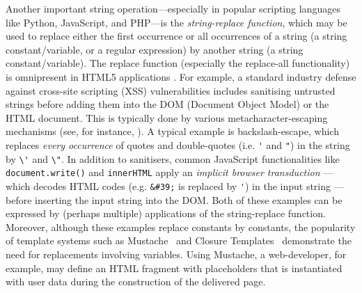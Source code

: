 Another important string operation---especially in popular scripting
languages like Python, JavaScript, and PHP---is the \emph{string-replace function}, 
which may be used to replace either the first occurrence or
all occurrences of a string (a string constant/variable, or a regular expression) by 
another string (a string constant/variable). The replace function (especially 
the replace-all functionality) is omnipresent in HTML5 applications
\cite{LB16,TCJ16,YABI14}. 
For example, a standard industry defense against cross-site scripting 
(XSS) vulnerabilities includes sanitising untrusted strings before adding them
into the DOM (Document Object Model) or the HTML document. 
This is typically done by %
various metacharacter-escaping mechanisms (see, for instance, 
\cite{Kern14,BEK,OWASP-XSS}). A typical example is backslash-escape, which replaces \emph{every
occurrence} of quotes and double-quotes (i.e. \verb+'+ and \verb+"+) in the
string by \verb+\'+ and \verb+\"+. 
In addition to sanitisers, common JavaScript functionalities like \texttt{document.write()} 
and \texttt{innerHTML} apply an \emph{implicit browser transduction} --- which
decodes HTML codes (e.g. \verb+&#39;+ is replaced by \verb+'+) in the input 
string --- before inserting the input string into the DOM.
Both of these examples can be expressed by (perhaps multiple) 
applications of the string-replace function.
Moreover, although these examples replace constants by constants, the popularity of template systems such as Mustache~\cite{Mustache} and Closure Templates~\cite{Closure} demonstrate the need for replacements involving variables.
Using Mustache, a web-developer, for example, may define an HTML fragment with placeholders that is instantiated with user data during the construction of the delivered page.





